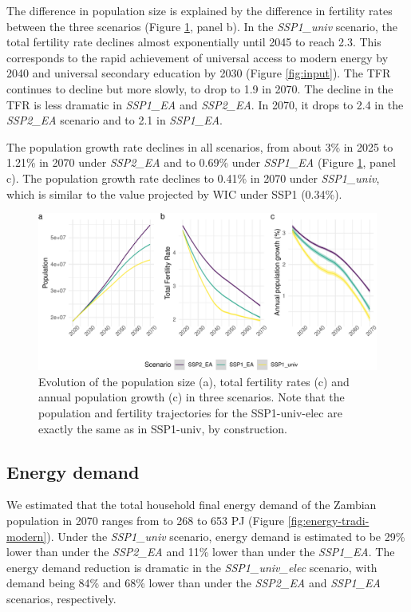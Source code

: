 \documentclass[
]{article}
\begin{document}
The difference in population size is explained by the difference in fertility rates between the three scenarios (Figure \ref{fig:population}, panel b). In the \emph{SSP1\_univ} scenario, the total fertility rate declines almost exponentially until 2045 to reach 2.3. This corresponds to the rapid achievement of universal access to modern energy by 2040 and universal secondary education by 2030 (Figure \ref{fig:input}). The TFR continues to decline but more slowly, to drop to 1.9 in 2070. The decline in the TFR is less dramatic in \emph{SSP1\_EA} and \emph{SSP2\_EA}. In 2070, it drops to 2.4 in the \emph{SSP2\_EA} scenario and to 2.1 in \emph{SSP1\_EA}.

The population growth rate declines in all scenarios, from about 3\% in 2025 to 1.21\% in 2070 under \emph{SSP2\_EA} and to 0.69\% under \emph{SSP1\_EA} (Figure \ref{fig:population}, panel c). The population growth rate declines to 0.41\% in 2070 under \emph{SSP1\_univ}, which is similar to the value projected by WIC under SSP1 (0.34\%).

\begin{figure}
\includegraphics[width=1\linewidth]{../figures/population-1} \caption{Evolution of the population size (a), total fertility rates (c)  and annual population growth (c) in three scenarios. Note that the population and fertility trajectories for the SSP1-univ-elec are exactly the same as in SSP1-univ, by construction.}\label{fig:population}
\end{figure}

\hypertarget{energy-demand}{%
\subsection{Energy demand}\label{energy-demand}}

We estimated that the total household final energy demand of the Zambian population in 2070 ranges from to 268 to 653 PJ (Figure \ref{fig:energy-tradi-modern}). Under the \emph{SSP1\_univ} scenario, energy demand is estimated to be 29\% lower than under the \emph{SSP2\_EA} and 11\% lower than under the \emph{SSP1\_EA}. The energy demand reduction is dramatic in the \emph{SSP1\_univ\_elec} scenario, with demand being 84\% and 68\% lower than under the \emph{SSP2\_EA} and \emph{SSP1\_EA} scenarios, respectively.
\end{document}
